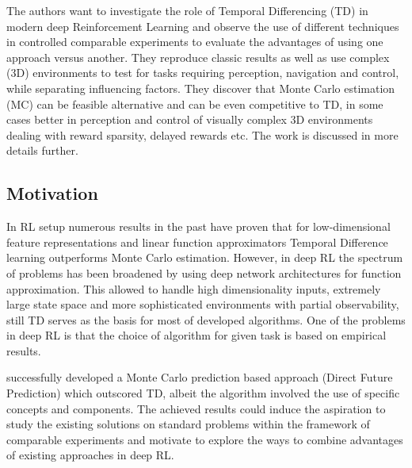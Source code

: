 \documentclass{article}
\begin{document}
\pagebreak

The authors want to investigate the role of Temporal Differencing (TD)
in modern deep Reinforcement Learning and observe the use of
different techniques in controlled comparable experiments to evaluate the
advantages of using one approach versus another.
They reproduce classic results as well as use
complex (3D) environments to test for tasks requiring perception,
navigation and control, while separating influencing factors.
They discover that Monte Carlo estimation
(MC) can be feasible alternative and can be even competitive to TD,
in some cases better
in perception and control of visually complex 3D environments
dealing with reward sparsity, delayed rewards etc.
The work is discussed in more details further.

\subsection{Motivation}
In RL setup numerous results in the past have proven
that for low-dimensional feature representations and linear function
approximators Temporal Difference learning outperforms
Monte Carlo estimation. However, in deep RL the spectrum of problems
has been broadened by using deep network architectures for function
approximation. This allowed to handle high dimensionality inputs,
extremely large state space and more sophisticated environments with partial
observability, still TD serves as the basis for
most of developed algorithms. One of the problems in deep RL is that
the choice of algorithm for given task is based on empirical results.

\citet{DBLP:journals/corr/DosovitskiyK16} successfully developed a Monte Carlo
prediction based approach (Direct Future Prediction) which outscored TD,
albeit the algorithm involved the use of specific concepts and
components. The achieved results
could induce the aspiration to study the existing solutions on standard
problems within the framework of comparable experiments and motivate
to explore the ways to combine advantages of existing approaches in deep RL.
\end{document}
